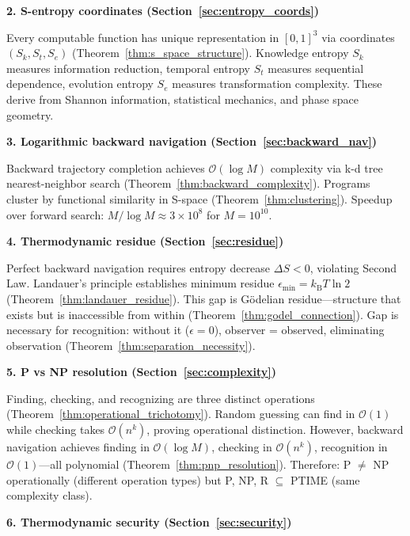 \documentclass[twocolumn,10pt]{article}
\theoremstyle{definition}
\theoremstyle{remark}
\newcommand{\kB}{k_{\text{B}}}
\newcommand{\Sk}{S_k}
\newcommand{\St}{S_t}
\newcommand{\Se}{S_e}
\newcommand{\bigO}{\mathcal{O}}
\begin{document}
\vspace{0.2cm}
\noindent\textbf{2. S-entropy coordinates (Section~\ref{sec:entropy_coords})}

Every computable function has unique representation in $[0,1]^3$ via coordinates $(\Sk, \St, \Se)$ (Theorem~\ref{thm:s_space_structure}). Knowledge entropy $\Sk$ measures information reduction, temporal entropy $\St$ measures sequential dependence, evolution entropy $\Se$ measures transformation complexity. These derive from Shannon information\cite{shannon1948}, statistical mechanics\cite{boltzmann1877}, and phase space geometry.

\vspace{0.2cm}
\noindent\textbf{3. Logarithmic backward navigation (Section~\ref{sec:backward_nav})}

Backward trajectory completion achieves $\bigO(\log M)$ complexity via k-d tree nearest-neighbor search (Theorem~\ref{thm:backward_complexity}). Programs cluster by functional similarity in S-space (Theorem~\ref{thm:clustering}). Speedup over forward search: $M/\log M \approx 3 \times 10^8$ for $M=10^{10}$.

\vspace{0.2cm}
\noindent\textbf{4. Thermodynamic residue (Section~\ref{sec:residue})}

Perfect backward navigation requires entropy decrease $\Delta S < 0$, violating Second Law. Landauer's principle establishes minimum residue $\epsilon_{\min} = \kB T \ln 2$ (Theorem~\ref{thm:landauer_residue}). This gap is Gödelian residue—structure that exists but is inaccessible from within (Theorem~\ref{thm:godel_connection}). Gap is necessary for recognition: without it ($\epsilon=0$), observer = observed, eliminating observation (Theorem~\ref{thm:separation_necessity}).

\vspace{0.2cm}
\noindent\textbf{5. P vs NP resolution (Section~\ref{sec:complexity})}

Finding, checking, and recognizing are three distinct operations (Theorem~\ref{thm:operational_trichotomy}). Random guessing can find in $\bigO(1)$ while checking takes $\bigO(n^k)$, proving operational distinction. However, backward navigation achieves finding in $\bigO(\log M)$, checking in $\bigO(n^k)$, recognition in $\bigO(1)$—all polynomial (Theorem~\ref{thm:pnp_resolution}). Therefore: P $\neq$ NP operationally (different operation types) but P, NP, R $\subseteq$ PTIME (same complexity class).

\vspace{0.2cm}
\noindent\textbf{6. Thermodynamic security (Section~\ref{sec:security})}
\end{document}
